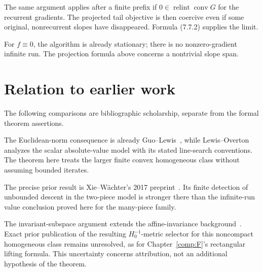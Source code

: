 The same argument applies after a finite prefix if
\(0\in\operatorname{relint}\operatorname{conv}G\) for the recurrent
gradients. The projected tail objective is then coercive even if some
original, nonrecurrent slopes have disappeared. Formula (7.7.2) supplies
the limit.

For \(f\equiv0\), the algorithm is already stationary; there is no
nonzero-gradient infinite run. The projection formula above concerns a
nontrivial slope span.


\endgroup


\section*{Relation to earlier work}
The following comparisons are bibliographic scholarship, separate from the formal theorem assertions.

The Euclidean-norm consequence is already Guo--Lewis~\cite[Corollary~4.2]{GL18}, while Lewis--Overton~\cite[Section~5.1]{LO} analyzes the scalar absolute-value model with its stated line-search conventions. The theorem here treats the larger finite convex homogeneous class without assuming bounded iterates.

The precise prior result is Xie--W\"achter's 2017 preprint~\cite[Theorem~IV.1]{XW}. Its finite detection of unbounded descent in the two-piece model is stronger there than the infinite-run value conclusion proved here for the many-piece family.

The invariant-subspace argument extends the affine-invariance background~\cite[Theorem~II.1]{XW}. Exact prior publication of the resulting $H_0^{-1}$-metric selector for this noncompact homogeneous class remains unresolved, as for Chapter~\ref{comp:F}'s rectangular lifting formula. This uncertainty concerns attribution, not an additional hypothesis of the theorem.
